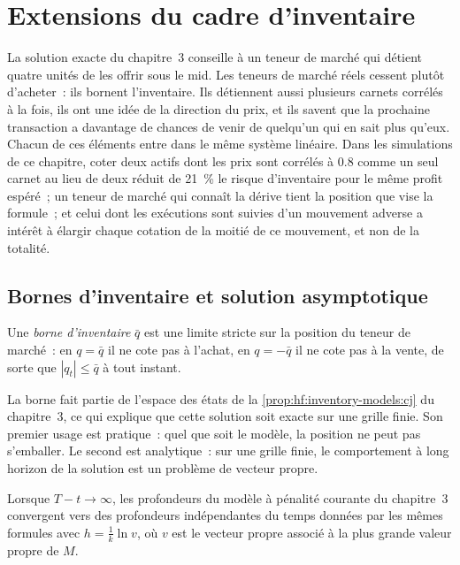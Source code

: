 \chapter{Extensions du cadre d'inventaire}\label{ch:hf:extensions-of-the-inventory-framework}

La solution exacte du chapitre~3 conseille à un teneur de marché qui détient quatre unités de les offrir sous le mid. Les teneurs de marché réels cessent plutôt d'acheter~:
ils bornent l'inventaire. Ils détiennent aussi plusieurs carnets corrélés à la fois, ils ont une idée de la direction du prix, et ils savent
que la prochaine transaction a davantage de chances de venir de quelqu'un qui en sait plus qu'eux. Chacun de ces éléments entre dans le même système linéaire. Dans
les simulations de ce chapitre, coter deux actifs dont les prix sont corrélés à 0.8 comme un seul carnet au lieu de deux réduit de 21~\% le risque d'inventaire pour le même
profit espéré~; un teneur de marché qui connaît la dérive tient la position que vise la formule~; et celui dont les exécutions sont suivies d'un mouvement adverse
a intérêt à élargir chaque cotation de la moitié de ce mouvement, et non de la totalité.

\section{Bornes d'inventaire et solution asymptotique}

\begin{definition}\label{def:hf:extensions-of-the-inventory-framework:bound}
Une \emph{borne d'inventaire} $\bar q$ est une limite stricte sur la position du teneur de marché~: en $q=\bar q$ il ne cote pas à l'achat, en
$q=-\bar q$ il ne cote pas à la vente, de sorte que $|q_t|\le\bar q$ à tout instant.
\end{definition}

La borne fait partie de l'espace des états de la \cref{prop:hf:inventory-models:cj} du chapitre~3, ce qui explique que cette solution soit exacte sur une grille finie. Son
premier usage est pratique~: quel que soit le modèle, la position ne peut pas s'emballer. Le second est analytique~: sur une grille finie, le comportement
à long horizon de la solution est un problème de vecteur propre.

\begin{proposition}\label{prop:hf:extensions-of-the-inventory-framework:stationary}
Lorsque $T-t\to\infty$, les profondeurs du modèle à pénalité courante du chapitre~3 convergent vers des profondeurs indépendantes du temps données par les mêmes formules avec
$h=\tfrac1k\ln v$, où $v$ est le vecteur propre associé à la plus grande valeur propre de $M$.
\end{proposition}

